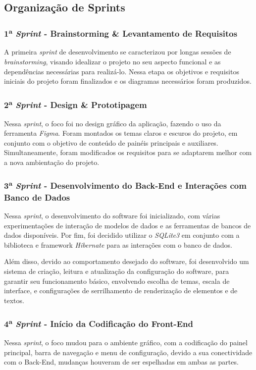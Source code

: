 \documentclass[a4paper,12pt]{article}
\begin{document}
\subsection{Organização de Sprints}
\subsubsection{1\textsuperscript{a} \textit{Sprint} - Brainstorming \& Levantamento de Requisitos}
A primeira \textit{sprint} de desenvolvimento se caracterizou por longas sessões de \textit{brainstorming}, visando idealizar o projeto no seu aspecto funcional e as dependências necessárias para realizá-lo. Nessa etapa os objetivos e requisitos iniciais do projeto foram finalizados e os diagramas necessários foram produzidos.

\subsubsection{2\textsuperscript{a} \textit{Sprint} - Design \& Prototipagem}
Nessa \textit{sprint}, o foco foi no design gráfico da aplicação, fazendo o uso da ferramenta \textit{Figma}. Foram montados os temas claros e escuros do projeto, em conjunto com o objetivo de conteúdo de painéis principais e auxiliares. Simultaneamente, foram modificados os requisitos para se adaptarem melhor com a nova ambientação do projeto.

\subsubsection{3\textsuperscript{a} \textit{Sprint} - Desenvolvimento do Back-End e Interações com Banco de Dados}
Nessa \textit{sprint}, o desenvolvimento do software foi inicializado, com várias experimentações de interação de modelos de dados e as ferramentas de bancos de dados disponíveis. Por fim, foi decidido utilizar o \textit{SQLite3} em conjunto com a biblioteca e framework \textit{Hibernate} para as interações com o banco de dados.

Além disso, devido ao comportamento desejado do software, foi desenvolvido um sistema de criação, leitura e atualização da configuração do software, para garantir seu funcionamento básico, envolvendo escolha de temas, escala de interface, e configurações de serrilhamento de renderização de elementos e de textos.

\subsubsection{4\textsuperscript{a} \textit{Sprint} - Início da Codificação do Front-End}
Nessa \textit{sprint}, o foco mudou para o ambiente gráfico, com a codificação do painel principal, barra de navegação e menu de configuração, devido a sua conectividade com o Back-End, mudanças houveram de ser espelhadas em ambas as partes.
\end{document}
